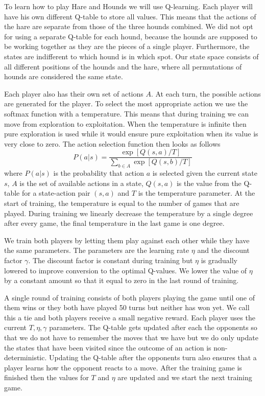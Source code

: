 To learn how to play Hare and Hounds we will use Q-learning\cite{watkins1992q}.
Each player will have his own different Q-table to store all values. This means that the
actions of the hare are separate from those of the three hounds combined. We
did not opt for using a separate Q-table for each hound, because the hounds are
supposed to be working together as they are the pieces of a single player. Furthermore,
the states are indifferent to which hound is in which spot. Our state space consists
of all different positions of the hounds and the hare, where all permutations of hounds are considered the same state.

Each player also has their own set of actions $A$. At each turn, the possible
actions are generated for the player. To select the most appropriate action we
use  the softmax function with a temperature. This means that during training
we can move from exploration to exploitation. When the temperature is infinite
then  pure exploration is used while it would ensure pure exploitation when its
value is very close to zero. The action selection function then looks as
follows
\[ P(a|s) = \frac{\exp[Q(s,a)/T]}{\sum_{b \in A} \exp[Q(s, b)/T]} \]
where $P(a|s)$ is the probability that action $a$ is selected given the
current state $s$, $A$ is the set of available actions in a state, $Q(s,a)$ is
the value from the Q-table for a state-action pair $(s,a)$ and $T$ is the
temperature parameter. At the start of training, the temperature is equal to
the number of games that are played. During training we linearly decrease the
temperature by a single degree after every game, the final temperature in the
last game is one degree.

We train both players by letting them play against each other while they have
the same parameters. The parameters are the learning rate $\eta$ and the
discount factor $\gamma$. The discount factor is constant during training but
$\eta$ is gradually lowered to improve conversion to the optimal
Q-values\cite{alpaydin}. We lower the value of $\eta$ by a constant amount so
that it equal to zero in the last round of training.

A single round of training consists of both players playing the game until one
of them wins or they both have played 50 turns but neither has won yet. We call
this a tie and both players receive a small negative reward. Each player uses
the current $T, \eta, \gamma$ parameters. The Q-table gets updated after each
the opponents so that we do not have to remember the moves that we have but we
do only update the states that have been visited since the outcome of an action
is non-deterministic. Updating the Q-table after the opponents turn also
ensures that a player learns how the opponent reacts to a move. After the
training game is finished then the values for $T$ and $\eta$ are updated and
we start the next training game.

